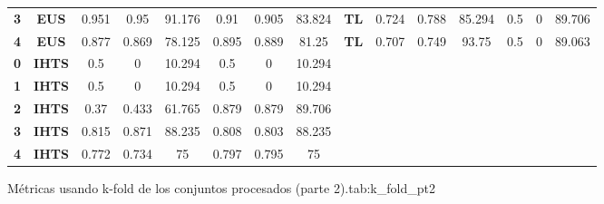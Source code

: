 {{\begin{tabular}{c|c|cccccc|ccccccc}
\textbf{3} & \textbf{EUS} & 0.951 & 0.95  & 91.176 & 0.91  & 0.905 & 83.824 & \multicolumn{1}{c|}{\textbf{TL}} & 0.724 & 0.788 & 85.294 & 0.5   & 0     & 89.706 \\
\textbf{4} & \textbf{EUS} & 0.877 & 0.869 & 78.125 & 0.895 & 0.889 & 81.25 & \multicolumn{1}{c|}{\textbf{TL}} & 0.707 & 0.749 & 93.75 & 0.5   & 0     & 89.063 \\
\textbf{0} & \textbf{IHTS} & 0.5   & 0     & 10.294 & 0.5   & 0     & 10.294 &       &       &       &       &       &       &  \\
\textbf{1} & \textbf{IHTS} & 0.5   & 0     & 10.294 & 0.5   & 0     & 10.294 &       &       &       &       &       &       &  \\
\textbf{2} & \textbf{IHTS} & 0.37  & 0.433 & 61.765 & 0.879 & 0.879 & 89.706 &       &       &       &       &       &       &  \\
\textbf{3} & \textbf{IHTS} & 0.815 & 0.871 & 88.235 & 0.808 & 0.803 & 88.235 &       &       &       &       &       &       &  \\
\textbf{4} & \textbf{IHTS} & 0.772 & 0.734 & 75    & 0.797 & 0.795 & 75    &       &       &       &       &       &       &  \\
\end{tabular}}}{Métricas usando k-fold de los conjuntos procesados (parte 2).}{tab:k_fold_pt2}

